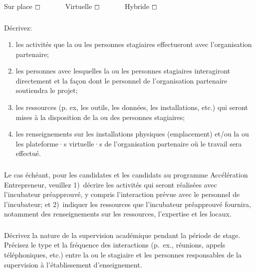 \documentclass{mitacs-acceleration}
\begin{document}
Sur place  $\boxempty$~~~~~~~Virtuelle  $\boxempty$~~~~~~~Hybride  $\boxempty$



\subsubsection{} \begin{instructions}
Décrivez:
\begin{enumerate}[label=\roman*.]
\item les activités que la ou les personnes stagiaires effectueront avec l'organisation partenaire;
\item les personnes avec lesquelles la ou les personnes stagiaires interagiront directement et la façon dont le personnel de l'organisation partenaire soutiendra le projet;
\item les ressources (p. ex, les outils, les données, les installations, etc.) qui seront mises à la disposition de la ou des personnes stagiaires; 
\item les renseignements sur les installations physiques (emplacement) et/ou la ou les plateforme·s virtuelle·s de l'organisation partenaire où le travail sera effectué.
\end{enumerate}
\end{instructions}

\subsubsection{} \begin{instructions}
Le cas échéant, pour les candidates et les candidats au programme Accélération Entrepreneur, veuillez 1)~décrire les activités qui seront réalisées avec l'incubateur préapprouvé, y compris l'interaction prévue avec le personnel de l'incubateur; et 2)~indiquer les ressources que l'incubateur préapprouvé fournira, notamment des renseignements sur les ressources, l'expertise et les locaux.
\end{instructions}

\subsubsection{}\begin{instructions}
Décrivez la nature de la supervision académique pendant la période de stage. Précisez le type et la fréquence des interactions (p.\ ex., réunions, appels téléphoniques, etc.) entre la ou le stagiaire et les personnes responsables de la supervision à l'établissement d'enseignement.
\end{instructions}
\end{document}
